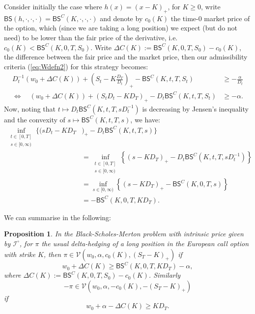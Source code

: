 \documentclass[a4paper]{amsart}
\newtheorem{proposition}[theorem]{Proposition}
\theoremstyle{definition}
\theoremstyle{remark}
\numberwithin{equation}{section}
\newcommand{\ie}{i.e.}
\newcommand{\Vc}{\mathcal{V}}
\newcommand{\In}{\mathcal{I}} %
\newcommand{\BS}{\mathsf{BS}}
\begin{document}
Consider initially the case where $h(x) = (x-K)_+$, for $K \ge 0$, write $\BS(h,\cdot,\cdot,\cdot) = \BS^C(K,\cdot,\cdot,\cdot)$ and denote by $c_0(K)$ the time-0 market price of the option, which (since we are taking a long position) we expect (but do not need) to be lower than the fair price of the derivative, \ie{} $c_0(K) < \BS^C(K,0,T,S_0)$. Write $\Delta C(K) := \BS^C(K,0,T,S_0) - c_0(K)$, the difference between the fair price and the market price, then our admissibility criteria (\ref{eq:Wdefn2}) for this strategy becomes:
\begin{align*}
   D_t^{-1}\left(w_0 + \Delta C(K)\right)  + \left(S_t-K \frac{D_T}{D_t}\right)_+ - \BS^C(K,t,T,S_t) & \ge -\frac{\alpha}{D_t}\\
   \iff  \quad  \left(w_0 + \Delta C(K) \right) + \left(S_tD_t-K D_T\right)_+ - D_t\BS^C(K,t,T,S_t) & \ge -\alpha.
\end{align*}
Now, noting that $t \mapsto D_t \BS^C(K,t,T,sD_t^{-1})$ is decreasing by Jensen's inequality and the convexity of $s \mapsto \BS^C(K,t,T,s)$, we have:
\begin{align*}
  \inf_{\substack{t \in [0,T]\\ s \in [0,\infty)}}
  \Big\{(sD_t- KD_T&)_+  - D_t\BS^C(K,t,T,s)\Big\} \\
  & = \inf_{\substack{t \in [0,T]\\ s \in [0,\infty)}}
  \left\{(s-KD_T)_+ - D_t\BS^C(K,t,T,sD_t^{-1})\right\} \\
  & = \inf_{ s \in [0,\infty)}
  \left\{(s-KD_T)_+ - \BS^C(K,0,T,s)\right\} \\
& = -\BS^C(K,0,T,KD_T).
\end{align*}

We can summarise in the following:
\begin{proposition}
  In the Black-Scholes-Merton problem with intrinsic price given by $\In^\circ$, for $\pi$ the usual delta-hedging of a long position in the European call option with strike $K$, then $\pi \in \Vc(w_0, \alpha, c_0(K), (S_T-K)_+)$ if
  \begin{equation} \label{eq:9}
    w_0 + \Delta C(K)  \ge \BS^C(K,0,T,KD_T) -\alpha,
  \end{equation}
  where $\Delta C(K) := \BS^C(K,0,T,S_0) - c_0(K)$.
  Similarly $$-\pi \in \Vc(w_0, \alpha, -c_0(K), -(S_T-K)_+)$$ if
  \begin{equation*}
    w_0 + \alpha - \Delta C(K) \ge K D_T.
  \end{equation*}
\end{proposition}
\end{document}
